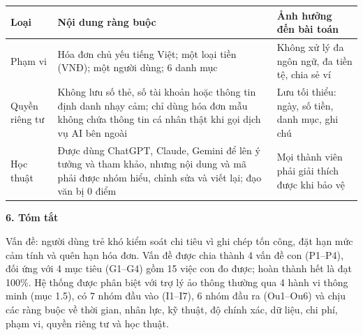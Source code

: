 \documentclass[a4paper,14pt]{extarticle}
\renewcommand{\arraystretch}{1.08}
\newcommand{\TableText}{\footnotesize}
\newcommand{\TableStart}{%
    \begingroup
    \TableText
    \renewcommand{\arraystretch}{1.05}
}
\newcommand{\TableEnd}{\endgroup}
\begin{document}
\newpage


\TableStart
\begingroup
\normalsize
\begin{tabularx}{\textwidth}{
    |P{3.2cm}|P{9cm}|Y|
}
\hline
\textbf{Loại}
& \textbf{Nội dung ràng buộc}
& \textbf{Ảnh hưởng đến bài toán}
\\
\hline
Phạm vi
& Hóa đơn chủ yếu tiếng Việt; một loại tiền (VNĐ); một người dùng; 6 danh mục
& Không xử lý đa ngôn ngữ, đa tiền tệ, chia sẻ ví
\\
\hline
Quyền riêng tư
& Không lưu số thẻ, số tài khoản hoặc thông tin định danh nhạy cảm; chỉ dùng hóa đơn mẫu không chứa thông tin cá nhân thật khi gọi dịch vụ AI bên ngoài
& Lưu tối thiểu: ngày, số tiền, danh mục, ghi chú
\\
\hline
Học thuật
& Được dùng ChatGPT, Claude, Gemini để lên ý tưởng và tham khảo, nhưng nội dung và mã phải được nhóm hiểu, chỉnh sửa và viết lại; đạo văn bị 0 điểm
& Mọi thành viên phải giải thích được khi bảo vệ
\\
\hline
\end{tabularx}
\endgroup
\TableEnd

\vspace{0.5cm}

{\normalsize\bfseries 6. Tóm tắt}

Vấn đề: người dùng trẻ khó kiểm soát chi tiêu vì ghi chép tốn
công, đặt hạn mức cảm tính và quên hạn hóa đơn. Vấn đề được
chia thành 4 vấn đề con (P1--P4), đối ứng với 4 mục tiêu
(G1--G4) gồm 15 việc con đo được; hoàn thành hết là đạt 100\%.
Hệ thống được phân biệt với trợ lý ảo thông thường qua 4 hành
vi thông minh (mục 1.5), có 7 nhóm đầu vào (I1--I7), 6 nhóm
đầu ra (Ou1--Ou6) và chịu các ràng buộc về thời gian, nhân lực,
kỹ thuật, độ chính xác, dữ liệu, chi phí, phạm vi, quyền riêng tư
và học thuật.
\end{document}
